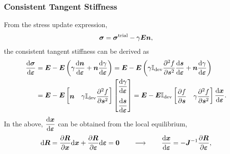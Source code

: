     \subsubsection{Consistent Tangent Stiffness}
    From the stress update expression,
    \begin{gather}
        \bm{\sigma}=\bm{\sigma}^\text{trial}-\gamma\bm{E}\bm{n},
    \end{gather}
    the consistent tangent stiffness can be derived as
    \begin{gather}
        \begin{split}
            \dfrac{\mathrm{d}\bm{\sigma}}{\mathrm{d}\bm{\varepsilon}} & =\bm{E}-\bm{E}\left(\gamma\dfrac{\mathrm{d}\bm{n}}{\mathrm{d}\bm{\varepsilon}}+\bm{n}\dfrac{\mathrm{d}\gamma}{\mathrm{d}\bm{\varepsilon}}\right)=\bm{E}-\bm{E}\left(\gamma\mathbb{I}_\text{dev}\dfrac{\partial{^2f}}{\partial{\bm{s}^2}}\dfrac{\mathrm{d}\bm{s}}{\mathrm{d}\bm{\varepsilon}}+\bm{n}\dfrac{\mathrm{d}\gamma}{\mathrm{d}\bm{\varepsilon}}\right) \\
                                           & =\bm{E}-\bm{E}\begin{bmatrix}
                                                               \bm{n} & \gamma\mathbb{I}_\text{dev}\dfrac{\partial{^2f}}{\partial{\bm{s}^2}}
                                                           \end{bmatrix}\begin{bmatrix}
                                                                            \dfrac{\mathrm{d}\gamma}{\mathrm{d}\bm{\varepsilon}} \\[4mm]
                                                                            \dfrac{\mathrm{d}\bm{s}}{\mathrm{d}\bm{\varepsilon}}
                                                                        \end{bmatrix}=\bm{E}-\bm{E}\mathbb{I}_\text{dev}\begin{bmatrix}
                                                                                                                            \dfrac{\partial{f}}{\partial{\bm{s}}} & \gamma\dfrac{\partial{^2f}}{\partial{\bm{s}^2}}
                                                                                                                        \end{bmatrix}\dfrac{\mathrm{d}\bm{x}}{\mathrm{d}\bm{\varepsilon}}.
        \end{split}
    \end{gather}
    In the above, $\dfrac{\mathrm{d}\bm{x}}{\mathrm{d}\bm{\varepsilon}}$ can be obtained from the local equilibrium,
    \begin{gather}
        \mathrm{d}\bm{R}=\dfrac{\partial{\bm{R}}}{\partial{\bm{x}}}\mathrm{d}\bm{x}+\dfrac{\partial{\bm{R}}}{\partial{\bm{\varepsilon}}}\mathrm{d}\bm{\varepsilon}=\bm{0}\qquad\longrightarrow\qquad\dfrac{\mathrm{d}\bm{x}}{\mathrm{d}\bm{\varepsilon}}=-\bm{J}^{-1}\dfrac{\partial{\bm{R}}}{\partial{\bm{\varepsilon}}},
    \end{gather}

